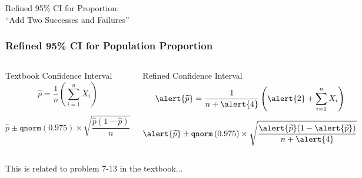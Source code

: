 \begin{frame}
\begin{center}
	\huge Refined 95\% CI for Proportion: \\``Add Two Successes and Failures''
\end{center}
\end{frame}
\begin{frame}
\frametitle{Refined 95\% CI for Population Proportion}
\small
\alert{}
\vspace{1em}

\begin{columns}

\begin{block}{Textbook Confidence Interval}
$$\widehat{p} = \frac{1}{n}\left(\sum_{i=1}^n X_i\right)$$

$$\widehat{p}\pm \texttt{qnorm}\left(0.975\right) \times\sqrt{\frac{\widehat{p}(1-\widehat{p})}{n}}$$
\end{block}

\begin{block}{Refined Confidence Interval}
$$\alert{\widetilde{p}} = \frac{1}{n+\alert{4}} \left(\alert{2}+ \sum_{i=1}^n X_i\right)$$

$$\alert{\widetilde{p}} \pm \texttt{qnorm}\left(0.975\right) \times \sqrt{\frac{\alert{\widetilde{p}}(1-\alert{\widetilde{p}})}{n+\alert{4}}}$$

\end{block}

\end{columns}

\vspace{1em}

\alert{This is related to problem 7-13 in the textbook...}
\end{frame}
